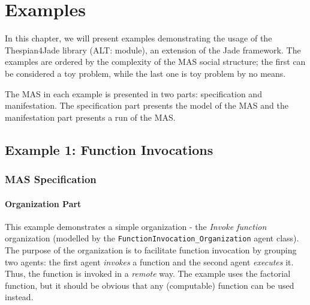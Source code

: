 
\chapter{Examples}

In this chapter, we will present examples demonstrating the usage of the Thespian4Jade library (ALT: module), an extension of the Jade framework.
The examples are ordered by the complexity of the MAS social structure; the first can be considered a toy problem, while the last one is toy problem by no means.

The MAS in each example is presented in two parts: specification and manifestation.
The specification part presents the model of the MAS and the manifestation part presents a run of the MAS.

\section{Example 1: Function Invocations}

\subsection*{MAS Specification}

\subsubsection*{Organization Part}

This example demonstrates a simple organization - the \textit{Invoke function} organization (modelled by the \texttt{FunctionInvocation\_Organization} agent class).
The purpose of the organization is to facilitate function invocation by grouping two agents: the first agent \textit{invokes} a function and the second agent \textit{executes} it.
Thus, the function is invoked in a \textit{remote} way.
The example uses the factorial function, but it should be obvious that any (computable) function can be used instead.

